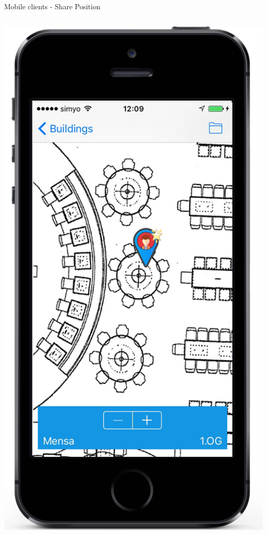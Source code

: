 \documentclass[11pt]{beamer}
\begin{document}
\begin{frame}{Mobile clients - Share Position}
\begin{columns}[T]
\begin{column}{.4\textwidth}
	\includegraphics[scale=0.27]{mappinpointb}
	\end{column}


\end{columns}
\end{frame}
\end{document}
